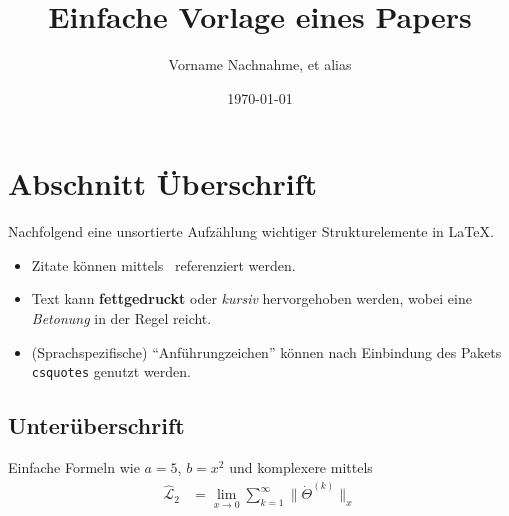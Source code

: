 \documentclass[a4paper, 12pt]{scrarticle} %
\title{Einfache Vorlage eines Papers}
\author{Vorname Nachnahme, {et alias}}
\date{\today}
\begin{document}
\maketitle %
\tableofcontents %

\section{Abschnitt Überschrift}
Nachfolgend eine unsortierte Aufzählung wichtiger Strukturelemente in \LaTeX{}.
\begin{itemize}
	\item Zitate können mittels~\cite{bib-ref:1} referenziert werden.
	\item Text kann \textbf{fettgedruckt} oder \textit{kursiv} hervorgehoben werden, wobei eine \emph{Betonung} in der Regel reicht.
	\item (Sprachspezifische) \enquote{Anführungzeichen} können nach Einbindung des Pakets \texttt{csquotes} genutzt werden.
\end{itemize}
\newpage %

\subsection{Unterüberschrift}
Einfache Formeln wie $a = 5$, \(b = x^2\) und komplexere mittels
\begin{align*}
	\hat{\mathcal{L}}_2 &= \lim_{x \to 0} \sum^{\infty}_{k=1} \| \dot{\Theta}^{(k)} \|_x
\end{align*}

\printbibliography %
\end{document}

